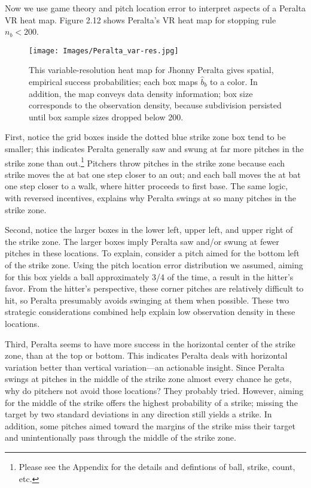 Now we use game theory and pitch location error to interpret aspects of a Peralta VR heat map. Figure 2.12 shows Peralta's VR heat map for stopping rule $n_{b} < 200$.
        \begin{figure}[H]
      	\centering      
      	\texttt{[image: Images/Peralta\_var-res.jpg]}
      	\caption{This variable-resolution heat map for Jhonny Peralta gives spatial, empirical success probabilities; each box maps $\hat{b}_{b}$ to a color. In addition, the map conveys data density information; box size corresponds to the observation density, because subdivision persisted until box sample sizes dropped below 200.}
        \end{figure}
First, notice the grid boxes inside the dotted blue strike zone box tend to be smaller; this indicates Peralta generally saw and swung at far more pitches in the strike zone than out.\footnote{Please see the Appendix for the details and defintions of ball, strike, count, etc.} Pitchers throw pitches in the strike zone because each strike moves the at bat one step closer to an out; and each ball moves the at bat one step closer to a walk, where hitter proceeds to first base. The same logic, with reversed incentives, explains why Peralta swings at so many pitches in the strike zone. 

Second, notice the larger boxes in the lower left, upper left, and upper right of the strike zone. The larger boxes imply Peralta saw and/or swung at fewer pitches in these locations. To explain, consider a pitch aimed for the bottom left of the strike zone. Using the pitch location error distribution we assumed, aiming for this box yields a ball approximately 3/4 of the time, a result in the hitter's favor. From the hitter's perspective, these corner pitches are relatively difficult to hit, so Peralta presumably avoids swinging at them when possible. These two strategic considerations combined help explain low observation density in these locations.

Third, Peralta seems to have more success in the horizontal center of the strike zone, than at the top or bottom. This indicates Peralta deals with horizontal variation better than vertical variation---an actionable insight. Since Peralta swings at pitches in the middle of the strike zone almost every chance he gets, why do pitchers not avoid those locations? They probably tried. However, aiming for the middle of the strike offers the highest probability of a strike; missing the target by two standard deviations in any direction still yields a strike. In addition, some pitches aimed toward the margins of the strike miss their target and unintentionally pass through the middle of the strike zone. 

